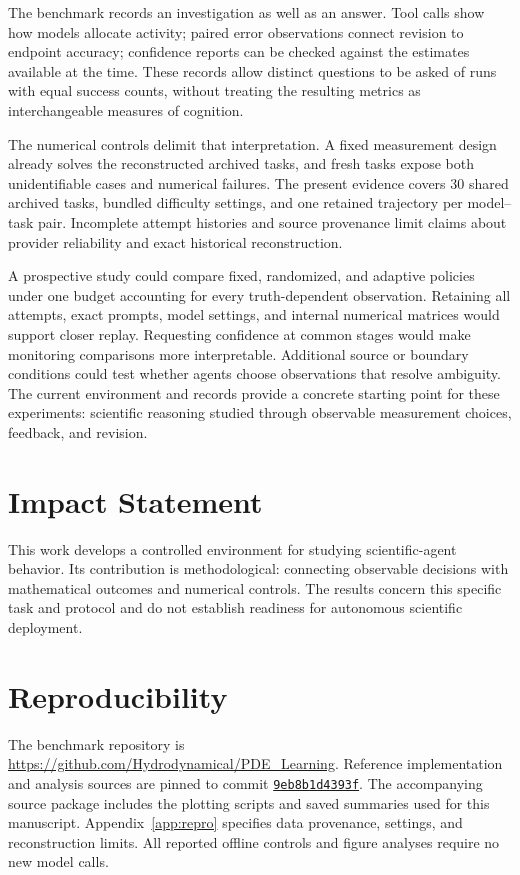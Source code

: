 \documentclass{article}
\begin{document}
The benchmark records an investigation as well as an answer. Tool calls show
how models allocate activity; paired error observations connect revision to
endpoint accuracy; confidence reports can be checked against the estimates
available at the time. These records allow distinct questions to be asked of
runs with equal success counts, without treating the resulting metrics as
interchangeable measures of cognition.

The numerical controls delimit that interpretation. A fixed measurement design
already solves the reconstructed archived tasks, and fresh tasks expose both
unidentifiable cases and numerical failures. The present evidence covers 30
shared archived tasks, bundled difficulty settings, and one retained trajectory
per model--task pair. Incomplete attempt histories and source provenance limit
claims about provider reliability and exact historical reconstruction.

A prospective study could compare fixed, randomized, and adaptive policies under
one budget accounting for every truth-dependent observation. Retaining all
attempts, exact prompts, model settings, and internal numerical matrices would
support closer replay. Requesting confidence at common stages would make
monitoring comparisons more interpretable. Additional source or boundary
conditions could test whether agents choose observations that resolve ambiguity.
The current environment and records provide a concrete starting point for these
experiments: scientific reasoning studied through observable measurement choices,
feedback, and revision.

\section*{Impact Statement}
This work develops a controlled environment for studying scientific-agent
behavior. Its contribution is methodological: connecting observable decisions
with mathematical outcomes and numerical controls. The results concern this
specific task and protocol and do not establish readiness for autonomous
scientific deployment.

\section*{Reproducibility}
The benchmark repository is
\url{https://github.com/Hydrodynamical/PDE_Learning}.
Reference implementation and analysis sources are pinned to commit
\href{https://github.com/Hydrodynamical/PDE_Learning/tree/9eb8b1d4393fbdb02af48d842de97cf5646d4952}{\texttt{9eb8b1d4393f}}.
The accompanying source package includes the plotting scripts and saved
summaries used for this manuscript. Appendix~\ref{app:repro} specifies data
provenance, settings, and reconstruction limits. All reported offline controls
and figure analyses require no new model calls.
\end{document}

